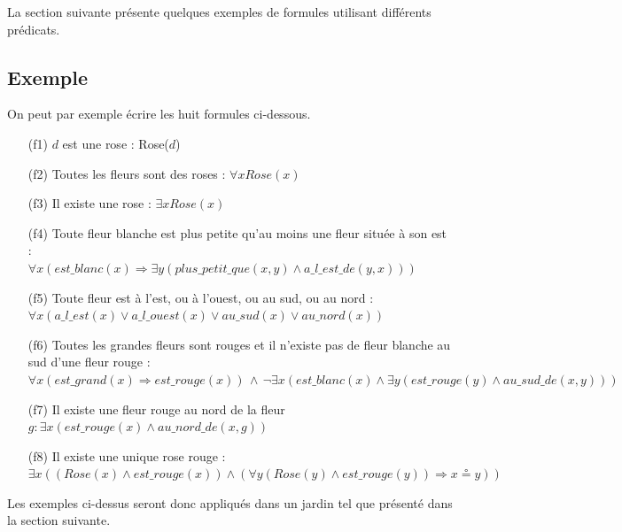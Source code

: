 La section suivante présente quelques exemples de formules utilisant
différents prédicats.

\subsection{Exemple}

On peut par exemple écrire les huit formules ci-dessous.
\begin{itemize}
    \item [(f1)] $d$ est une rose : Rose($d$)
    \item [(f2)] Toutes les fleurs sont des roses : $\forall x Rose(x)$
    \item [(f3)] Il existe une rose : $\exists x Rose(x)$
    \item [(f4)] Toute fleur blanche est plus petite qu'au moins une fleur située à son est :\\
      $\forall x (est\_blanc(x) \Rightarrow \exists y
      (plus\_petit\_que(x, y) \wedge a\_l\_est\_de(y, x)))$
    \item [(f5)] Toute fleur est à l'est, ou à l'ouest, ou au sud, ou au nord : \\
$\forall x (a\_l\_est(x) \vee a\_l\_ouest(x) \vee au\_sud(x) \vee au\_nord(x))$
    \item [(f6)] Toutes les grandes fleurs sont rouges et il n'existe pas de fleur blanche au sud d'une fleur rouge : \\
    $\forall x (est\_grand(x) \Rightarrow est\_rouge(x))\, \wedge \,\neg \exists x (est\_blanc(x) \wedge \exists y (est\_rouge(y) \wedge au\_sud\_de(x, y)))$
    \item [(f7)] Il existe une fleur rouge au nord de la fleur $g : \exists x (est\_rouge(x) \wedge au\_nord\_de(x, g))$
    \item [(f8)] Il existe une unique rose rouge : \\
    $\exists x ((Rose(x) \wedge est\_rouge(x)) \wedge (\forall y (Rose(y) \wedge est\_rouge(y)) \Rightarrow x \circeq y))$
\end{itemize}

Les exemples ci-dessus seront donc appliqués dans un jardin tel que présenté dans la section suivante.

